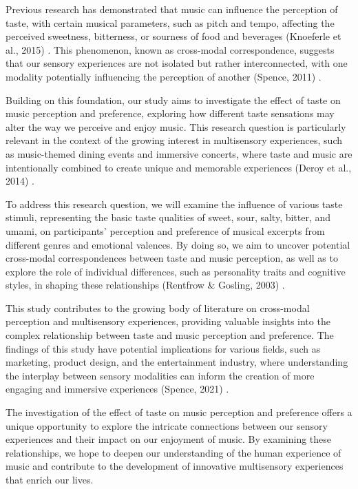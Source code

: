 \documentclass[conference]{IEEEtran}
\begin{document}
Previous research has demonstrated that music can influence the perception of taste, with certain musical parameters, such as pitch and tempo, affecting the perceived sweetness, bitterness, or sourness of food and beverages (Knoeferle et al., 2015) \cite{b4}. This phenomenon, known as cross-modal correspondence, suggests that our sensory experiences are not isolated but rather interconnected, with one modality potentially influencing the perception of another (Spence, 2011) \cite{b5}.

Building on this foundation, our study aims to investigate the effect of taste on music perception and preference, exploring how different taste sensations may alter the way we perceive and enjoy music. This research question is particularly relevant in the context of the growing interest in multisensory experiences, such as music-themed dining events and immersive concerts, where taste and music are intentionally combined to create unique and memorable experiences (Deroy et al., 2014) \cite{b6}.

To address this research question, we will examine the influence of various taste stimuli, representing the basic taste qualities of sweet, sour, salty, bitter, and umami, on participants' perception and preference of musical excerpts from different genres and emotional valences. By doing so, we aim to uncover potential cross-modal correspondences between taste and music perception, as well as to explore the role of individual differences, such as personality traits and cognitive styles, in shaping these relationships (Rentfrow \& Gosling, 2003) \cite{b7}.

This study contributes to the growing body of literature on cross-modal perception and multisensory experiences, providing valuable insights into the complex relationship between taste and music perception and preference. The findings of this study have potential implications for various fields, such as marketing, product design, and the entertainment industry, where understanding the interplay between sensory modalities can inform the creation of more engaging and immersive experiences (Spence, 2021) \cite{b2}.

The investigation of the effect of taste on music perception and preference offers a unique opportunity to explore the intricate connections between our sensory experiences and their impact on our enjoyment of music. By examining these relationships, we hope to deepen our understanding of the human experience of music and contribute to the development of innovative multisensory experiences that enrich our lives.
\end{document}
